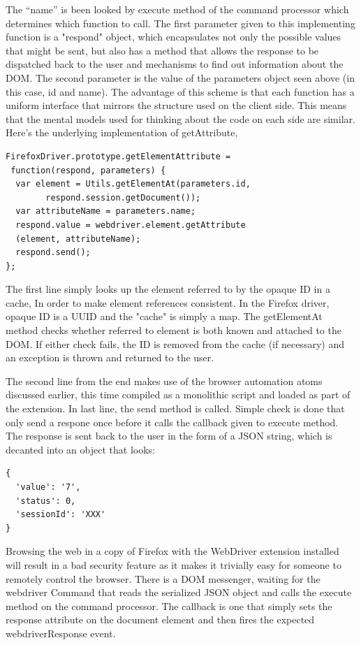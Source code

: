 \documentclass[12pt]{report}
\begin{document}
The “name” is been looked by execute method of the command processor which determines which function to call. The first parameter given to this implementing function is a "respond" object, which encapsulates not only the possible values that might be sent, but also has a method that allows the response to be dispatched back to the user and mechanisms to find out information about the DOM. The second parameter is the value of the parameters object seen above (in this case, id and name). The advantage of this scheme is that each function has a uniform interface that mirrors the structure used on the client side. This means that the mental models used for thinking about the code on each side are similar. Here's the underlying implementation of getAttribute,
\begin{verbatim}
FirefoxDriver.prototype.getElementAttribute =
 function(respond, parameters) {
  var element = Utils.getElementAt(parameters.id,
        respond.session.getDocument());
  var attributeName = parameters.name;
  respond.value = webdriver.element.getAttribute
  (element, attributeName);
  respond.send();
};

\end{verbatim}
The first line simply looks up the element referred to by the opaque ID in a cache, In order to make element references consistent. In the Firefox driver, opaque ID is a UUID and the "cache" is simply a map. The getElementAt method checks whether referred to element is both known and attached to the DOM. If either check fails, the ID is removed from the cache (if necessary) and an exception is thrown and returned to the user.

The second line from the end makes use of the browser automation atoms discussed earlier, this time compiled as a monolithic script and loaded as part of the extension.
In last line, the send method is called. Simple check is done that only send a respone once before it calls the callback given to execute method. The response is sent back to the user in the form of a JSON string, which is decanted into an object that looks:

\begin{verbatim}
{
  'value': '7',
  'status': 0,
  'sessionId': 'XXX'
}
\end{verbatim}
Browsing the web in a copy of Firefox with the WebDriver extension installed will result in a bad security feature as it makes it trivially easy for someone to remotely control the browser.
There is a DOM messenger, waiting for the webdriver Command that reads the serialized JSON object and calls the execute method on the command processor. The callback is one that simply sets the response attribute on the document element and then fires the expected webdriverResponse event.
\end{document}
